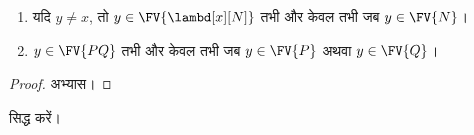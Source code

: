 \documentclass[../../../include/open-logic-section]{subfiles}
\begin{document}
\begin{lem}
  \begin{enumerate}
    \item {} यदि $y \neq x$, तो $y \in
      \FV{\lambd[x][N]}$ तभी और केवल तभी जब $y \in \FV{N}$।
    \item {} $y \in \FV{PQ}$ तभी और केवल तभी जब $y \in
      \FV{P}$ अथवा $y \in \FV{Q}$।
    \end{enumerate}
\end{lem}

\begin{proof}
  अभ्यास।
\end{proof}

\begin{prob}
   सिद्ध करें।
\end{prob}
\end{document}
